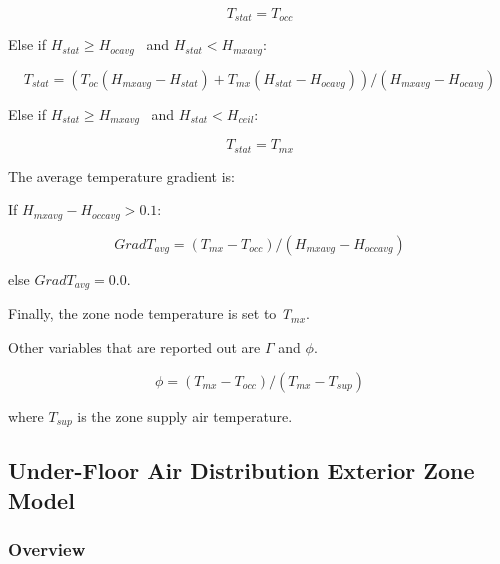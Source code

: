 {\begin{equation}
{T_{stat}} = {T_{occ}}
\end{equation}

Else if \({H_{stat}} \ge {H_{ocavg}}\) ~and \({H_{stat}} < {H_{mxavg}}\):

\begin{equation}
{T_{stat}} = \left( {{T_{oc}}\left( {{H_{mxavg}} - {H_{stat}}} \right) + {T_{mx}}\left( {{H_{stat}} - {H_{ocavg}}} \right)} \right)/\left( {{H_{mxavg}} - {H_{ocavg}}} \right)
\end{equation}

Else if \({H_{stat}} \ge {H_{mxavg}}\) ~and \({H_{stat}} < {H_{ceil}}\):

\begin{equation}
{T_{stat}} = {T_{mx}}
\end{equation}

The average temperature gradient is:

If \({H_{mxavg}} - {H_{occavg}} > 0.1\):

\begin{equation}
Grad{T_{avg}} = ({T_{mx}} - {T_{occ}})/({H_{mxavg}} - {H_{occavg}})
\end{equation}

else \(Grad{T_{avg}} = 0.0\).

Finally, the zone node temperature is set to \emph{T\(_{mx}\)}.

Other variables that are reported out are \(\Gamma\) and \(\phi\).

\begin{equation}
\phi  = ({T_{mx}} - {T_{occ}})/({T_{mx}} - {T_{sup}})
\end{equation}

where \({T_{sup}}\) is the zone supply air temperature.

\subsection{Under-Floor Air Distribution Exterior Zone Model}\label{under-floor-air-distribution-exterior-zone-model}

\subsubsection{Overview}\label{overview-2-001}

}
